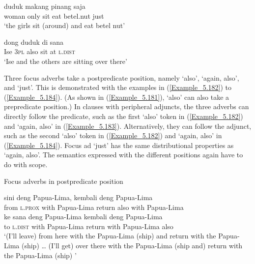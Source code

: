 \ea
\label{Example_5.180}
 {} {duduk} {makang} {pinang} {saja}\\ %
 woman  only  sit  eat  betel.nut  just\\
\glt 
‘the girls  sit (around) and eat betel nut’ \textstyleExampleSource{[081014-007-CvEx.0045]}
\z

\ea
\label{Example_5.181}
 {dong} {} {duduk} {di} {sana}\\ %
 Ise  \textsc{3pl}  also  sit  at  \textsc{l.dist}\\
\glt 
‘Ise and the others are  sitting over there’ \textstyleExampleSource{[081025-009b-Cv.0075]}
\z


Three focus adverbs take a postpredicate position, namely  ‘also’,  ‘again, also’, and  ‘just’. This is demonstrated with the examples in (\ref{Example_5.182}) to (\ref{Example_5.184}). (As shown in (\ref{Example_5.181}),  ‘also’ can also take a prepredicate position.) In clauses with peripheral adjuncts, the three adverbs can directly follow the predicate, such as the first  ‘also’ token in (\ref{Example_5.182}) and  ‘again, also’ in (\ref{Example_5.183}). Alternatively, they can follow the adjunct, such as the second  ‘also’ token in (\ref{Example_5.182}) and  ‘again, also’ in (\ref{Example_5.184}). Focus ad  ‘just’ has the same distributional properties as  ‘again, also’. The semantics expressed with the different positions again have to do with scope.


\begin{styleExampleTitle}
Focus adverbs in postpredicate position
\end{styleExampleTitle}

\ea
\label{Example_5.182}
 {{sini}} {{deng}} {{Papua-Lima,}} {{kembali}} {{}} {deng} {{Papua-Lima}}\\ %
 {from}  {\textsc{l.prox}}  {with}  {Papua-Lima}  {return}  {also}  with  {Papua-Lima}\\
 \gll {\ldots}  ke  sana  {deng}  {Papua-Lima}  {kembali}  {deng}  {Papua-Lima}  \\
 { }   to  \textsc{l.dist}  {with}  {Papua-Lima}  {return}  {with}  {Papua-Lima}  also\\
\glt 
‘(I’ll leave) from here with the Papua-Lima (ship) and return  with the Papua-Lima (ship) {\ldots} (I’ll get) over there with the Papua-Lima (ship and) return with the Papua-Lima (ship) ’ \textstyleExampleSource{[080922-001a-CvPh.0483/0493]}
\z

